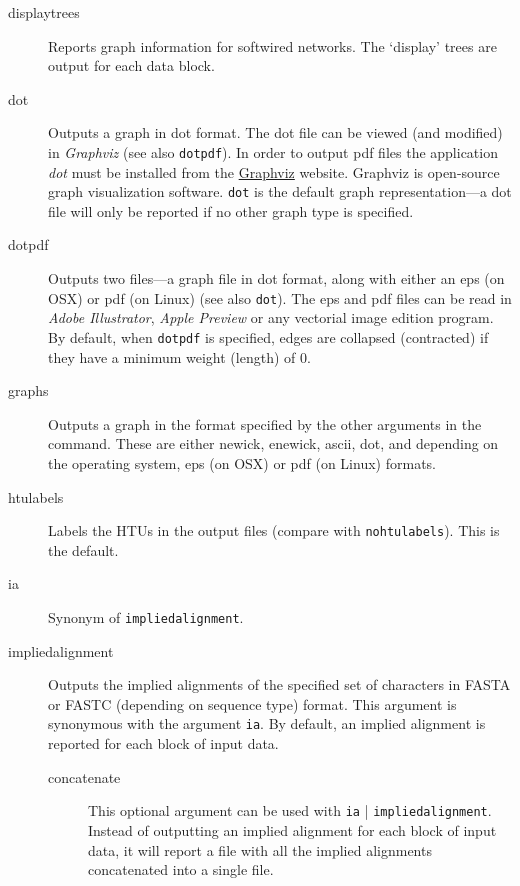 \begin{description}
		\item[displaytrees] Reports graph information for softwired networks. The 
		`display' trees are output for each data block. 
		
		\item[dot] Outputs a graph in dot format. The dot file can be viewed (and 
		modified) in \textit{Graphviz} (see also \texttt{dotpdf}). In order to output pdf 
		files the application \textit{dot} must be installed from the 
		\href{https://graphviz.org/download/}{Graphviz} 	website. Graphviz is 
		open-source graph visualization software. \texttt{dot} is the default graph 
		representation---a dot file will only be reported if no 
		other graph type is specified. 
		
		\item[dotpdf] Outputs two files---a graph file in dot format, along with either
		an eps (on OSX) or pdf (on Linux) (see also \texttt{dot}). The eps and pdf 
		files can be read in \textit{Adobe Illustrator}, \textit{Apple Preview} or any 
		vectorial image edition program.  By default, when \texttt{dotpdf} is specified,
		edges are collapsed (contracted) if they have a minimum weight 
		(length) of 0.
		
		\item[graphs] Outputs a graph in the format specified by the other arguments 
		in the command. These are either newick, enewick, ascii, dot, and depending 
		on the operating system, eps (on OSX) or pdf (on Linux) formats.
		
		\item[htulabels] Labels the HTUs in the output files (compare with 
		\texttt{nohtulabels}). This is the default.
		
		\item[ia] Synonym of \texttt{impliedalignment}.
		
		\item[impliedalignment] Outputs the implied alignments of the specified 
		set of characters in FASTA or FASTC (depending on sequence type) format. 
		This argument is synonymous with 
		the argument \texttt{ia}. By default, an implied alignment is reported for 
		each block of input data. 
		
		\begin{description}
			\item[concatenate] This optional argument can be used with \texttt{ia}
			| \texttt{impliedalignment}. Instead of outputting an implied alignment 
			for each block of input data, it will report a file with all the implied 
			alignments concatenated into a single file.
			

\end{description}
\end{description}
